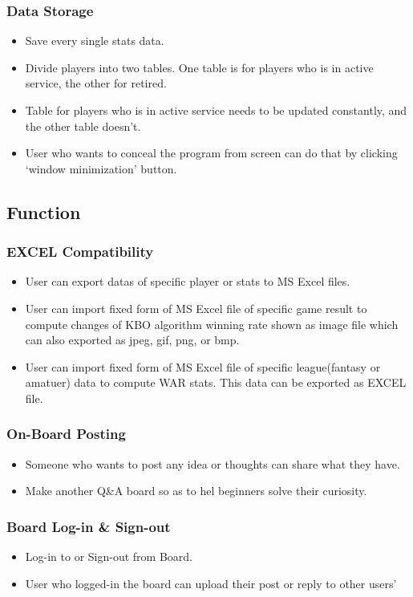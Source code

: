 \documentclass[conference,compsoc, twocolumn]{IEEEtran}
\begin{document}
\subsubsection{Data Storage}
\begin{itemize}
\item Save every single stats data.
\item Divide players  into two tables. One table is for players who is in active service, the other for retired.
\item Table for players who is in active service needs to be updated constantly, and the other table doesn’t.
\item User who wants to conceal  the program from screen can do that by clicking ‘window minimization’ button.
\end{itemize}

\subsection{Function}


\subsubsection{EXCEL Compatibility}
\begin{itemize}
\item User can export datas of specific player or stats  to MS Excel files.
\item User can import fixed form of MS Excel file of specific game result to compute changes of KBO algorithm winning rate shown as image file which can also exported as jpeg, gif, png, or bmp.
\item User can import fixed form of MS Excel file of specific league(fantasy or amatuer) data to compute WAR stats. This data can be exported as EXCEL file.
\end{itemize}

\subsubsection{On-Board Posting}
\begin{itemize}
\item Someone who wants to post any idea or thoughts can share what they have.
\item Make another Q\&A board so as to hel beginners solve their curiosity.
\end{itemize}

\subsubsection{Board Log-in \& Sign-out}
\begin{itemize}
\item Log-in to or Sign-out from Board.
\item User who logged-in the board can upload their post or reply to other users’
\end{itemize}
\end{document}
